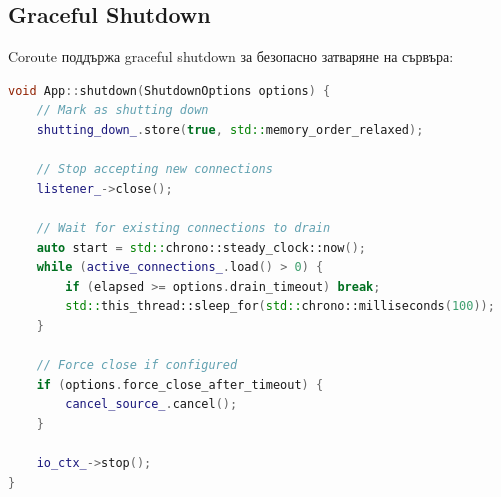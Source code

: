 \subsection{Graceful Shutdown}

Coroute поддържа graceful shutdown за безопасно затваряне на сървъра:

\begin{lstlisting}[language=C++, basicstyle=\small\ttfamily, caption={Graceful shutdown}]
void App::shutdown(ShutdownOptions options) {
    // Mark as shutting down
    shutting_down_.store(true, std::memory_order_relaxed);
    
    // Stop accepting new connections
    listener_->close();
    
    // Wait for existing connections to drain
    auto start = std::chrono::steady_clock::now();
    while (active_connections_.load() > 0) {
        if (elapsed >= options.drain_timeout) break;
        std::this_thread::sleep_for(std::chrono::milliseconds(100));
    }
    
    // Force close if configured
    if (options.force_close_after_timeout) {
        cancel_source_.cancel();
    }
    
    io_ctx_->stop();
}
\end{lstlisting}
